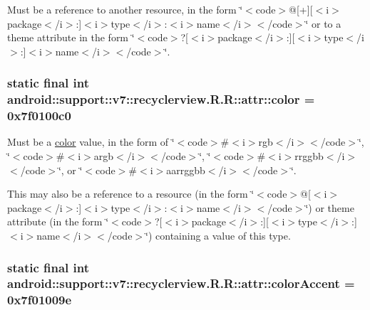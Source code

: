 Must be a reference to another resource, in the form \char`\"{}$<$code$>$@\mbox{[}+\mbox{]}\mbox{[}$<$i$>$package$<$/i$>$:\mbox{]}$<$i$>$type$<$/i$>$:$<$i$>$name$<$/i$>$$<$/code$>$\char`\"{} or to a theme attribute in the form \char`\"{}$<$code$>$?\mbox{[}$<$i$>$package$<$/i$>$:\mbox{]}\mbox{[}$<$i$>$type$<$/i$>$:\mbox{]}$<$i$>$name$<$/i$>$$<$/code$>$\char`\"{}. \hypertarget{classandroid_1_1support_1_1v7_1_1recyclerview_1_1_r_1_1attr_af271b987ea4db1fb8e4ec05ed7ef97e}{
\subsubsection[{color}]{\setlength{\rightskip}{0pt plus 5cm}static final int android::support::v7::recyclerview.R.R::attr::color = 0x7f0100c0}}
\label{classandroid_1_1support_1_1v7_1_1recyclerview_1_1_r_1_1attr_af271b987ea4db1fb8e4ec05ed7ef97e}


Must be a \hyperlink{classandroid_1_1support_1_1v7_1_1recyclerview_1_1_r_1_1color}{color} value, in the form of \char`\"{}$<$code$>$\#$<$i$>$rgb$<$/i$>$$<$/code$>$\char`\"{}, \char`\"{}$<$code$>$\#$<$i$>$argb$<$/i$>$$<$/code$>$\char`\"{}, \char`\"{}$<$code$>$\#$<$i$>$rrggbb$<$/i$>$$<$/code$>$\char`\"{}, or \char`\"{}$<$code$>$\#$<$i$>$aarrggbb$<$/i$>$$<$/code$>$\char`\"{}. 

This may also be a reference to a resource (in the form \char`\"{}$<$code$>$@\mbox{[}$<$i$>$package$<$/i$>$:\mbox{]}$<$i$>$type$<$/i$>$:$<$i$>$name$<$/i$>$$<$/code$>$\char`\"{}) or theme attribute (in the form \char`\"{}$<$code$>$?\mbox{[}$<$i$>$package$<$/i$>$:\mbox{]}\mbox{[}$<$i$>$type$<$/i$>$:\mbox{]}$<$i$>$name$<$/i$>$$<$/code$>$\char`\"{}) containing a value of this type. \hypertarget{classandroid_1_1support_1_1v7_1_1recyclerview_1_1_r_1_1attr_e6a873c9360191223531f681f1159d0f}{
\subsubsection[{colorAccent}]{\setlength{\rightskip}{0pt plus 5cm}static final int android::support::v7::recyclerview.R.R::attr::colorAccent = 0x7f01009e}}
\label{classandroid_1_1support_1_1v7_1_1recyclerview_1_1_r_1_1attr_e6a873c9360191223531f681f1159d0f}



